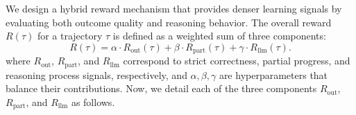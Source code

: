 
We design a hybrid reward mechanism that provides denser learning signals by evaluating both outcome quality and reasoning behavior. The overall reward $R(\tau)$ for a trajectory $\tau$ is defined as a weighted sum of three components:
%
\begin{equation}
    R(\tau) = \alpha \cdot R_{\text{out}}(\tau) + \beta \cdot R_{\text{part}}(\tau) + \gamma \cdot R_{\text{llm}}(\tau).
\end{equation}
%
where $R_{\text{out}}$, $R_{\text{part}}$, and $R_{\text{llm}}$ correspond to strict correctness, partial progress, and reasoning process signals, respectively, and $\alpha, \beta, \gamma$ are hyperparameters that balance their contributions. 
Now, we detail each of the three components $R_{\text{out}}$, $R_{\text{part}}$, and $R_{\text{llm}}$ as follows. 


